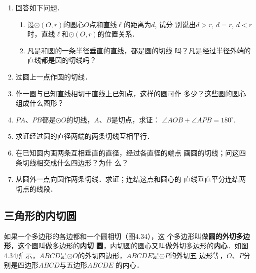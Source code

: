 \begin{ex}
\begin{enumerate}
    \item 回答如下问题．
\begin{enumerate}
    \item 设$\odot (O,r)$的圆心$O$点和直线$\ell$的距离为$d$, 试分
    别说出$d>r$, $d=r$, $d<r$时，直线$\ell$和$\odot (O,r)$的位置关系．
    \item 凡是和圆的一条半径垂直的直线，都是圆的切线
    吗？凡是经过半径外端的直线都是圆的切线吗？
\end{enumerate}
    \item 过圆上一点作圆的切线．
    \item 作一圆与已知直线相切于直线上已知点，这样的圆可作
    多少？这些圆的圆心组成什么图形？
    \item $PA$、$PB$都是$\odot O$的切线，$A$、$B$是切点，求证：
    $\angle AOB+\angle APB=180^{\circ}$.
    \item 求证经过圆的直径两端的两条切线互相平行．
    \item 在已知圆内画两条互相垂直的直径，经过各直径的端点
    画圆的切线；问这四条切线相交成什么四边形？为什
    么？
    \item 从圆外一点向圆作两条切线．求证；连结这点和圆心的
    直线垂直平分连结两切点的线段．
\end{enumerate}
\end{ex}

\subsection{三角形的内切圆}
如果一个多边形的各边都和一个圆相切（图4.34），这
个多边形叫做\textbf{圆的外切多边形}，这个圆叫做多边形的\textbf{内切
圆}，内切圆的圆心又叫做外切多边形的\textbf{内心}．如图4.34所
示，$ABCD$是$\odot O$的外切四边形，$ABCDE$是$\odot P$的外切五
边形等，$O$、$P$分别是四边形$ABCD$与五边形$ABCDE$
的内心．

